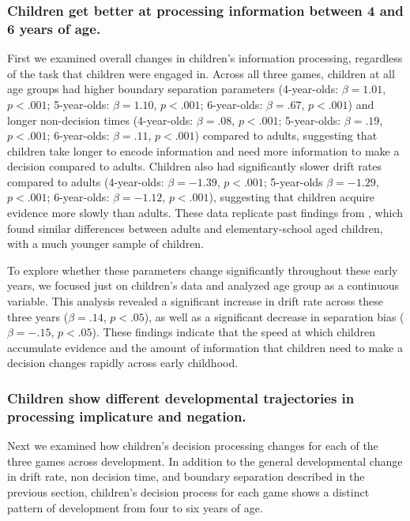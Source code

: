 \documentclass[10pt,letterpaper]{article}
\begin{document}
\subsubsection{Children get better at processing information between 4 and 6 years of age.}

First we examined overall changes in children's information processing, regardless of the task that children were engaged in. Across all three games, children at all age groups had higher boundary separation parameters (4-year-olds: $\beta = 1.01$, $p <.001$; 5-year-olds: $\beta = 1.10$, $p <.001$; 6-year-olds: $\beta = .67$, $p <.001$) and longer non-decision times (4-year-olds: $\beta = .08$, $p <.001$; 5-year-olds: $\beta = .19$, $p <.001$; 6-year-olds: $\beta = .11$, $p <.001$) compared to adults, suggesting that children take longer to encode information and need more information to make a decision compared to adults.  Children also had significantly slower drift rates compared to adults (4-year-olds: $\beta = -1.39$, $p <.001$; 5-year-olds $\beta = -1.29$, $p <.001$; 6-year-olds: $\beta = -1.12$, $p <.001$), suggesting that children acquire evidence more slowly than adults.  These data replicate past findings from , which found similar differences between adults and elementary-school aged children, with a much younger sample of children.  

To explore whether these parameters change significantly throughout these early years, we focused just on children's data and analyzed age group as a continuous variable.  This analysis revealed a significant increase in drift rate across these three years ($\beta = .14$, $p < .05$), as well as a significant decrease in separation bias ($\beta = -.15$, $p < .05$).  These findings indicate that the speed at which children accumulate evidence and the amount of information that children need to make a decision changes rapidly across early childhood.  

\subsubsection{Children show different developmental trajectories in processing implicature and negation.}

Next we examined how children's decision processing changes for each of the three games across development.  In addition to the general developmental change in drift rate, non decision time, and boundary separation described in the previous section, children's decision process for each game shows a distinct pattern of development from four to six years of age.  
\end{document}
